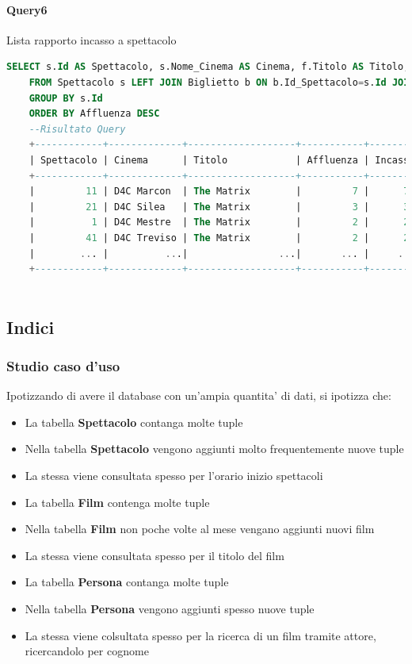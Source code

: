 \documentclass[10pt]{article}
\begin{document}
	\paragraph{Query6}
	Lista rapporto incasso a spettacolo
	\begin{lstlisting}[language=SQL]
	SELECT s.Id AS Spettacolo, s.Nome_Cinema AS Cinema, f.Titolo AS Titolo, COUNT(b.Id_Persona) AS Affluenza, COUNT(b.Id_Persona)*10 as Incasso
	FROM Spettacolo s LEFT JOIN Biglietto b ON b.Id_Spettacolo=s.Id JOIN Film f ON f.Id=s.Id_Film
	GROUP BY s.Id
	ORDER BY Affluenza DESC
	--Risultato Query
	+------------+-------------+-------------------+-----------+---------+
	| Spettacolo | Cinema      | Titolo            | Affluenza | Incasso |
	+------------+-------------+-------------------+-----------+---------+
	|         11 | D4C Marcon  | The Matrix        |         7 |      70 |
	|         21 | D4C Silea   | The Matrix        |         3 |      30 |
	|          1 | D4C Mestre  | The Matrix        |         2 |      20 |
	|         41 | D4C Treviso | The Matrix        |         2 |      20 |
	|        ... |          ...|                ...|       ... |     ... |
	+------------+-------------+-------------------+-----------+---------+	
	
	\end{lstlisting}
	\subsection{Indici}
	\subsubsection{Studio caso d'uso}
	Ipotizzando di avere il database con un'ampia quantita' di dati, si ipotizza che:
	\begin{itemize}
		\item La tabella \textbf{Spettacolo} contanga molte tuple
		\item Nella tabella \textbf{Spettacolo} vengono aggiunti molto frequentemente nuove tuple
		\item La stessa viene consultata spesso per l'orario inizio spettacoli
		\item La tabella \textbf{Film} contenga molte tuple
		\item Nella tabella \textbf{Film} non poche volte al mese vengano aggiunti nuovi film
		\item La stessa viene consultata spesso per il titolo del film
		\item La tabella \textbf{Persona} contanga molte tuple
		\item Nella tabella \textbf{Persona} vengono aggiunti spesso nuove tuple
		\item La stessa viene colsultata spesso per la ricerca di un film tramite attore, ricercandolo per cognome
	\end{itemize}
\end{document}
